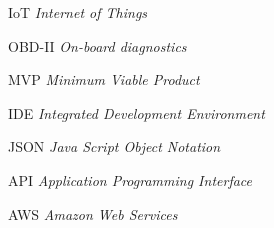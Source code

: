 \begin{basedescript}{\desclabelstyle{\pushlabel}\desclabelwidth{6em}}
\item[{IoT}] \textit{Internet of Things}
\item[{OBD-II}] \textit{On-board diagnostics}
\item[{MVP}] \textit{Minimum Viable Product}
\item[{IDE}] \textit{Integrated Development Environment}
\item[{JSON}] \textit{Java Script Object Notation}
\item[{API}] \textit{Application Programming Interface}
\item[{AWS}] \textit{Amazon Web Services}

\end{basedescript}
